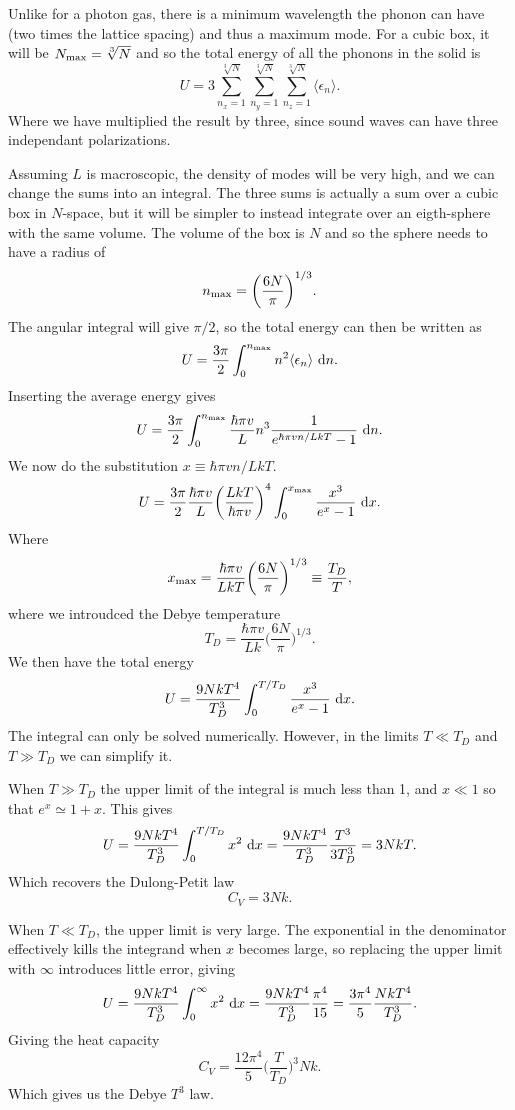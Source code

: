 \documentclass[a4paper, 11pt, notitlepage, english]{article}
\renewcommand{\d}{{\rm d}}
\newcommand{\eps}{\epsilon}
\begin{document}
Unlike for a photon gas, there is a minimum wavelength the phonon can have (two times the lattice spacing) and thus a maximum mode. For a cubic box, it will be $N_{\rm max} = \sqrt[3]{N}$ and so the total energy of all the phonons in the solid is
$$U = 3\sum_{n_x=1}^{\sqrt[3]{N}}\sum_{n_y=1}^{\sqrt[3]{N}}\sum_{n_z=1}^{\sqrt[3]{N}} \langle \eps_n \rangle.$$
Where we have multiplied the result by three, since sound waves can have three independant polarizations.

Assuming $L$ is macroscopic, the density of modes will be very high, and we can change the sums into an integral. The three sums is actually a sum over a cubic box in $N$-space, but it will be simpler to instead integrate over an eigth-sphere with the same volume. The volume of the box is $N$ and so the sphere needs to have a radius of
$$n_{\rm max} = \bigg(\frac{6N}{\pi}\bigg)^{1/3}.$$
The angular integral will give $\pi/2$, so the total energy can then be written as
$$U = \frac{3\pi}{2} \int_{0}^{n_{\rm max}}  n^2 \langle \eps_n \rangle \ \d n.$$
Inserting the average energy gives
$$U = \frac{3\pi}{2} \int_{0}^{n_{\rm max}} \frac{\hbar \pi v}{L}n^3 \frac{1}{e^{\hbar \pi v n/LkT} - 1} \ \d n.$$ 
We now do the substitution $x \equiv \hbar \pi v n/LkT$.
$$U = \frac{3\pi}{2} \frac{\hbar \pi v}{L} \bigg(\frac{LkT}{\hbar\pi v}\bigg)^4 \int_0^{x_{\rm max}} \frac{x^3}{e^x-1} \ \d x.$$
Where 
$$x_{\rm max} = \frac{\hbar\pi v}{LkT} \bigg(\frac{6N}{\pi}\bigg)^{1/3} \equiv \frac{T_D}{T},$$
where we introudced the Debye temperature
$$T_D = \frac{\hbar\pi v}{Lk} \bigg(\frac{6N}{\pi}\bigg)^{1/3}.$$
We then have the total energy
$$U = \frac{9NkT^4}{T_D^3}\int_0^{T/T_D} \frac{x^3}{e^x - 1} \ \d x.$$
The integral can only be solved numerically. However, in the limits $T\ll T_D$ and $T \gg T_D$ we can simplify it.

When $T\gg T_D$ the upper limit of the integral is much less than 1, and $x \ll 1$ so that $e^x \simeq 1 + x$. This gives
$$U = \frac{9NkT^4}{T_D^3}\int_0^{T/T_D} x^2 \ \d x = \frac{9NkT^4}{T_D^3} \frac{T^3}{3T_D^3} = 3NkT.$$
Which recovers the Dulong-Petit law
$$C_V = 3Nk.$$

When $T \ll T_D$, the upper limit is very large. The exponential in the denominator effectively kills the integrand when $x$ becomes large, so replacing the upper limit with $\infty$ introduces little error, giving
$$U = \frac{9NkT^4}{T_D^3}\int_0^\infty x^2 \ \d x = \frac{9NkT^4}{T_D^3} \frac{\pi^4}{15} = \frac{3\pi^4}{5} \frac{NkT^4}{T_D^3}.$$
Giving the heat capacity
$$C_V = \frac{12\pi^4}{5}\bigg(\frac{T}{T_D}\bigg)^3Nk.$$
Which gives us the Debye $T^3$ law.
\end{document}
